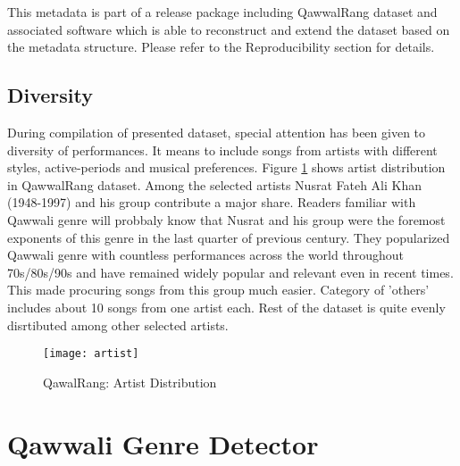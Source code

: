\documentclass{article}
\begin{document}
This metadata is part of a release package including QawwalRang dataset and associated software which is able to reconstruct and extend the dataset based on the metadata structure. Please refer to the Reproducibility section for details.

\subsection{Diversity}

During compilation of presented dataset, special attention has been given to diversity of performances. It means to include songs from artists with different styles, active-periods and musical preferences. Figure \ref{fig:author_dist} shows artist distribution in QawwalRang dataset. Among the selected artists Nusrat Fateh Ali Khan (1948-1997) \citep{nusrat} and his group contribute a major share. Readers familiar with Qawwali genre will probbaly know that Nusrat and his group were the foremost exponents of this genre in the last quarter of previous century. They popularized Qawwali genre with countless performances across the world throughout 70s/80s/90s and have remained widely popular and relevant even in recent times. This made procuring songs from this group much easier. Category of 'others' includes about 10 songs from one artist each. Rest of the dataset is quite evenly disrtibuted among other selected artists.

\begin{figure}[htbp]
  \centering
  \texttt{[image: artist]}
  \caption{QawalRang: Artist Distribution}
\label{fig:author_dist}
\end{figure}

\section{Qawwali Genre Detector}\label{sec:detector}
\end{document}
